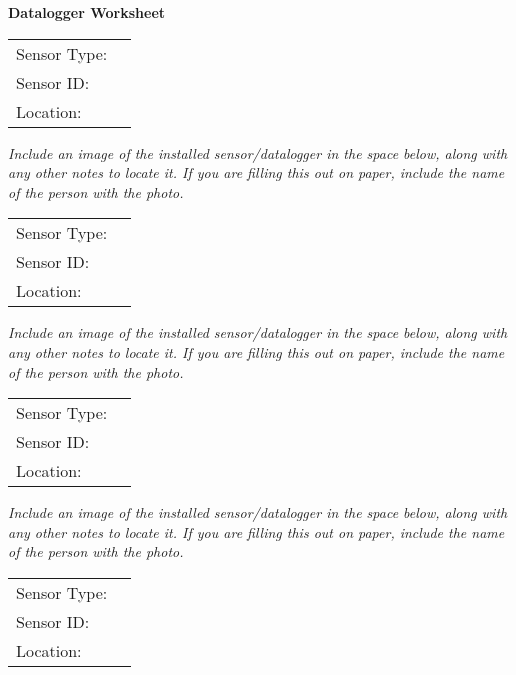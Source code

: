 \documentclass[./main.tex]{subfiles}
\begin{document}
\begin{center}
\Large\textbf{Datalogger Worksheet}
\end{center}


\noindent\begin{tabularx}{\textwidth}{@{}lX@{}}
Sensor Type: & \hrulefill \\[2ex]
Sensor ID: & \hrulefill \\[2ex]
Location: & \hrulefill \\[2ex]
\end{tabularx}

\noindent \emph{Include an image of the installed sensor/datalogger in the space below,  along with any other notes to locate it.  If you are filling this out on paper, include the name of the person with the photo. }

\vspace{7cm}

\noindent\begin{tabularx}{\textwidth}{@{}lX@{}}
Sensor Type: & \hrulefill \\[2ex]
Sensor ID: & \hrulefill \\[2ex]
Location: & \hrulefill \\[2ex]
\end{tabularx}

\noindent \emph{Include an image of the installed sensor/datalogger in the space below,  along with any other notes to locate it.  If you are filling this out on paper, include the name of the person with the photo. }

\clearpage

\noindent\begin{tabularx}{\textwidth}{@{}lX@{}}
Sensor Type: & \hrulefill \\[2ex]
Sensor ID: & \hrulefill \\[2ex]
Location: & \hrulefill \\[2ex]
\end{tabularx}

\noindent \emph{Include an image of the installed sensor/datalogger in the space below,  along with any other notes to locate it.  If you are filling this out on paper, include the name of the person with the photo. }

\vspace{7cm}

\noindent\begin{tabularx}{\textwidth}{@{}lX@{}}
Sensor Type: & \hrulefill \\[2ex]
Sensor ID: & \hrulefill \\[2ex]
Location: & \hrulefill \\[2ex]
\end{tabularx}
\end{document}
